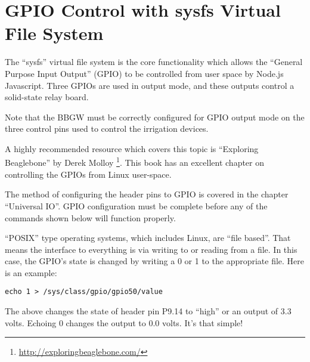 %
%
%

\chapter{GPIO Control with sysfs Virtual File System}

The ``sysfs'' virtual file system is the core functionality which allows the 
``General Purpose Input Output'' (GPIO) to be controlled from user space by 
Node.js Javascript.  Three GPIOs are used in output mode, and these outputs 
control a solid-state relay board.

Note that the BBGW must be correctly configured for GPIO output mode on the 
three control pins used to control the irrigation devices.

A highly recommended resource which covers this topic is ``Exploring 
Beaglebone'' by Derek Molloy 
\footnote{\url{http://exploringbeaglebone.com/}}.
This book has an excellent chapter on controlling the GPIOs from Linux 
user-space.

The method of configuring the header pins to GPIO is covered in the chapter 
``Universal IO''.  GPIO configuration must be complete before any of the 
commands shown below will function properly.

``POSIX'' type operating systems, which includes Linux, are ``file based''.  
That means the interface to everything is via writing to or reading from a 
file.  In this case, the GPIO's state is changed by writing a 0 or 1 to the 
appropriate file.  Here is an example:

\begin{verbatim}
echo 1 > /sys/class/gpio/gpio50/value
\end{verbatim}

The above changes the state of header pin P9.14 to ``high'' or an output of 3.3 
volts.  Echoing 0 changes the output to 0.0 volts.  It's that simple!

